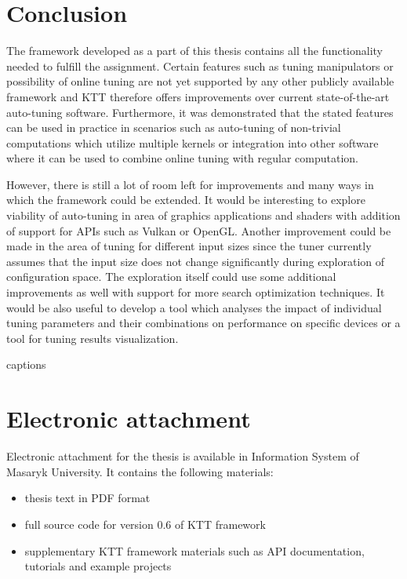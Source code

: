 \documentclass
[
    digital, %
    oneside, %
    table, %
    nolof, %
    nolot, %
    nocover %
]{fithesis3}
\begin{document}
\FloatBarrier

\chapter{Conclusion}
The framework developed as a part of this thesis contains all the functionality needed to fulfill the assignment. Certain features such as tuning
manipulators or possibility of online tuning are not yet supported by any other publicly available framework and KTT therefore offers improvements
over current state-of-the-art auto-tuning software. Furthermore, it was demonstrated that the stated features can be used in practice in scenarios
such as auto-tuning of non-trivial computations which utilize multiple kernels or integration into other software where it can be used to combine
online tuning with regular computation.

However, there is still a lot of room left for improvements and many ways in which the framework could be extended. It would be interesting to explore
viability of auto-tuning in area of graphics applications and shaders with addition of support for APIs such as Vulkan or OpenGL. Another improvement
could be made in the area of tuning for different input sizes since the tuner currently assumes that the input size does not change significantly during
exploration of configuration space. The exploration itself could use some additional improvements as well with support for more search optimization
techniques. It would be also useful to develop a tool which analyses the impact of individual tuning parameters and their combinations on performance on
specific devices or a tool for tuning results visualization.

\csname captions\languagename\endcsname
\makeatletter
\thesis@selectLocale{\thesis@locale}\makeatother
\printbibliography[heading=bibintoc]

\appendix
\chapter{Electronic attachment}
Electronic attachment for the thesis is available in Information System of Masaryk University. It contains the following materials:
\begin{itemize}
    \item thesis text in PDF format
    \item full source code for version 0.6 of KTT framework
    \item supplementary KTT framework materials such as API documentation, tutorials and example projects
\end{itemize}
\end{document}
